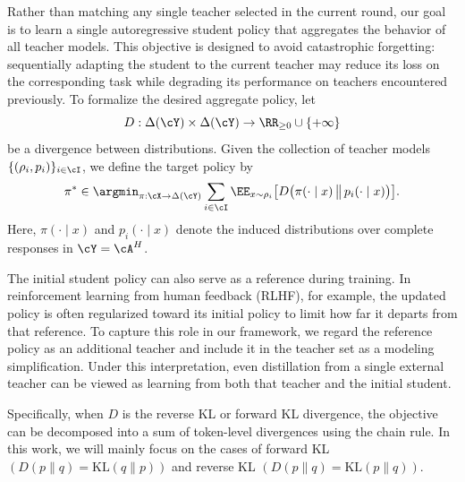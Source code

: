 \documentclass[11pt]{article}
\newcommand{\KL}{\text{KL}}
\begin{document}
Rather than matching any single teacher selected in the current round, our goal is to learn a single autoregressive student policy that aggregates the behavior of all teacher models. This objective is designed to avoid catastrophic forgetting: sequentially adapting the student to the current teacher may reduce its loss on the corresponding task while degrading its performance on teachers encountered previously. To formalize the desired aggregate policy, let
\[
    D:\Delta(\cY)\times\Delta(\cY)
    \rightarrow \RR_{\geq 0}\cup\{+\infty\}
\]
be a divergence between distributions. Given the collection of teacher models
$\{(\rho_i,p_i)\}_{i\in\cI}$, we define the target policy by
\begin{align}
\label{eq:average-objective}
    \pi^*
    \in
    \argmin_{\pi:\cX\rightarrow\Delta(\cY)}
    \sum_{i\in\cI}
    \EE_{x\sim\rho_i}
    \big[
        D\big(
            \pi(\cdot\mid x)
            \,\big\|\,
            p_i(\cdot\mid x)
        \big)
    \big].
\end{align}
Here, $\pi(\cdot\mid x)$ and $p_i(\cdot\mid x)$ denote the induced distributions over complete responses in $\cY=\cA^H$. 
\begin{remark}
The initial student policy can also serve as a reference during training. In reinforcement learning from human feedback (RLHF), for example, the updated policy is often regularized toward its initial policy to limit how far it departs from that reference. To capture this role in our framework, we regard the reference policy as an additional teacher and include it in the teacher set as a modeling simplification. Under this interpretation, even distillation from a single external teacher can be viewed as learning from both that teacher and the initial student.
\end{remark}
Specifically, when $D$ is the reverse KL or forward KL divergence, the objective can be decomposed into a sum of token-level divergences using the chain rule.
In this work, we will mainly focus on the cases of forward KL $(D(p\|q)=\KL(q\|p))$ and reverse KL $(D(p\|q)=\KL(p\|q))$.
\end{document}
